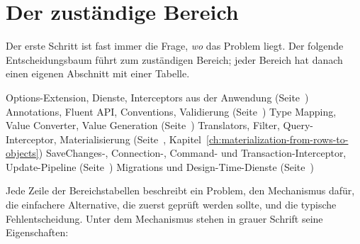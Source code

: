 \section{Der zuständige Bereich}

Der erste Schritt ist fast immer die Frage, \emph{wo} das Problem liegt. Der folgende
Entscheidungsbaum führt zum zuständigen Bereich; jeder Bereich hat danach einen eigenen
Abschnitt mit einer Tabelle.

\begin{decisiontree}
    {Options-Extension, Dienste, Interceptors aus der Anwendung (Seite~\pageref{sec:decide-configuration})}
    {Annotations, Fluent API, Conventions, Validierung (Seite~\pageref{sec:decide-model})}
    {Type Mapping, Value Converter, Value Generation (Seite~\pageref{sec:decide-model})}
    {Translators, Filter, Query-Interceptor, Materialisierung
    (Seite~\pageref{sec:decide-queries}, Kapitel~\ref{ch:materialization-from-rows-to-objects})}
    {SaveChanges-, Connection-, Command- und Transaction-Interceptor, Update-Pipeline
    (Seite~\pageref{sec:decide-runtime})}
    {Migrations und Design-Time-Dienste (Seite~\pageref{sec:decide-tooling})}
\end{decisiontree}

Jede Zeile der Bereichstabellen beschreibt ein Problem, den Mechanismus dafür, die
einfachere Alternative, die zuerst geprüft werden sollte, und die typische Fehlentscheidung.
Unter dem Mechanismus stehen in grauer Schrift seine Eigenschaften:

